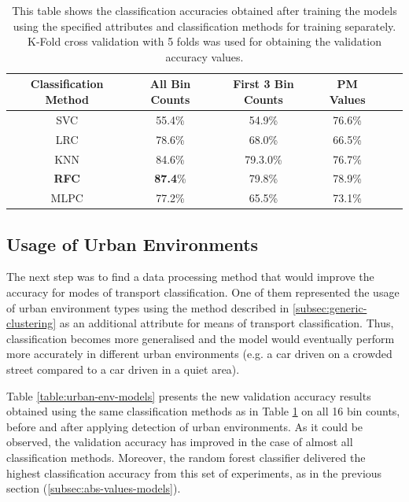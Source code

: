 \documentclass[bsc,frontabs,twoside,singlespacing,parskip,deptreport]{infthesis}     %
\begin{document}
\begin{table}[h!]
\centering
 \begin{tabular}{||c | c | c | c | c | c||} 
 \hline
 Classification Method & All Bin Counts & First 3 Bin Counts & PM Values \\ [0.5ex] 
 \hline\hline
 SVC & 55.4\% & 54.9\% & 76.6\% \\ 
 \hline
 LRC & 78.6\% & 68.0\% & 66.5\% \\
 \hline
 KNN & 84.6\% & 79.3.0\% & 76.7\% \\ 
 \hline
 \textbf{RFC} & \textbf{87.4}\% & 79.8\% & 78.9\% \\ 
 \hline
  MLPC & 77.2\% & 65.5\% & 73.1\% \\ 
 \hline
\end{tabular}
\caption{This table shows the classification accuracies obtained after training the models using the specified attributes and classification methods for training separately. K-Fold cross validation with 5 folds was used for obtaining the validation accuracy values.}
\label{table:abs-values-models}
\end{table}


\subsection{Usage of Urban Environments}
\label{subsec:results-urban-env-use}

The next step was to find a data processing method that would improve the accuracy for modes of transport classification. One of them represented the usage of urban environment types using the method described in \ref{subsec:generic-clustering} as an additional attribute for means of transport classification. Thus, classification becomes more generalised and the model would eventually perform more accurately in different urban environments (e.g. a car driven on a crowded street compared to a car driven in a quiet area).

Table \ref{table:urban-env-models} presents the new validation accuracy results obtained using the same classification methods as in Table \ref{table:abs-values-models} on all 16 bin counts, before and after applying detection of urban environments. As it could be observed, the validation accuracy has improved in the case of almost all classification methods. Moreover, the random forest classifier delivered the highest classification accuracy from this set of experiments, as in the previous section (\ref{subsec:abs-values-models}).
\end{document}
